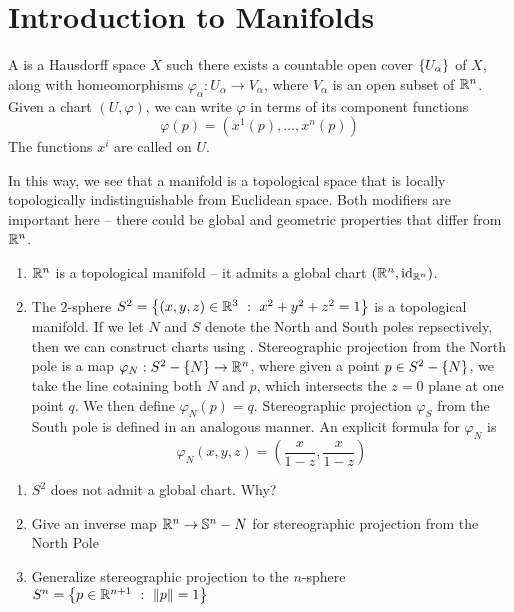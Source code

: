 \section{Introduction to Manifolds}
%
\begin{defn}
A  is a Hausdorff space $X$ such there exists a countable open cover $\left\lbrace U_\alpha \right\rbrace$
of $X$, along with homeomorphisms $\varphi_\alpha : U_\alpha \to V_\alpha$, where $V_\alpha$ is an open subset 
of $\mathbb{R}^n$. Given a chart $(U, \varphi)$, we can write $\varphi$ in terms of its component functions 
$$\varphi(p) = (x^1(p), \ldots, x^n(p)) $$
The functions $x^i$ are called  on $U$.

\end{defn}
%
In this way, we see that a manifold is a topological space that is locally topologically indistinguishable from
Euclidean space. Both modifiers are important here -- there could be global and geometric properties that 
differ from $\mathbb{R}^n$.
%
\begin{exmp}\enumbreak 
	\begin{enumerate}
		\item $\mathbb{R}^n$ is a topological manifold -- it admits a global chart $(\mathbb{R}^n, \operatorname{id}_{\mathbb{R}^n})$.
		\item The $2$-sphere $S^2 = \left\lbrace (x,y,z) \in \mathbb{R}^3 ~:~ x^2 + y^2 + z^2 = 1 \right\rbrace$ is a topological
		manifold. If we let $N$ and $S$ denote the North and South poles repsectively, then we can 
		construct charts using . Stereographic projection from the North
		pole is a map $\varphi_N : S^2 - \left\lbrace N \right\rbrace \to \mathbb{R}^n$, where given a point $p \in S^2 - \left\lbrace N \right\rbrace$,
		we take the line cotaining both $N$ and $p$, which intersects the $z = 0 $ plane at one point 
		$q$. We then define $\varphi_N(p) = q$. Stereographic projection $\varphi_S$ from the South 
		pole is defined in an analogous manner. An explicit formula for $\varphi_N$ is 
		$$\varphi_N(x,y,z) = \left(\frac{x}{1 - z}, \frac{x}{1 - z} \right) $$
	\end{enumerate}
\end{exmp}
%
\begin{exer}\enumbreak
	\begin{enumerate}
		\item $S^2$ does not admit a global chart. Why?
		\item Give an inverse map $\mathbb{R}^n \to \mathbb{S}^n - {N}$ for stereographic projection from the 
			North Pole
		\item Generalize stereographic projection to the $n$-sphere 
		$S^n = \left\lbrace p \in \mathbb{R}^{n+1} ~:~ \left\lVert p\right\rVert = 1 \right\rbrace$
	\end{enumerate}
\end{exer}
